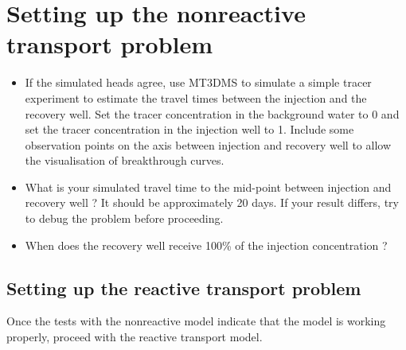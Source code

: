 \section[Setting up the nonreactive transport problem]{Setting up the nonreactive transport problem}

\begin{itemize}

\item If the simulated heads agree, use MT3DMS to simulate a simple tracer experiment
to estimate the travel times between the injection and the recovery well. 
Set the tracer concentration in the background water to 0 and set 
the tracer concentration in the injection well to 1. Include some observation 
points on the axis between injection and recovery well to allow the visualisation
of breakthrough curves.

\item What is your simulated travel time to the mid-point between 
injection and recovery well ? It should be approximately 20 days.
If your result differs, try to debug the problem before proceeding.

\item When does the recovery well receive 100\% of the injection concentration ? 

\end{itemize} 

\subsection[Setting up the reactive transport problem]{Setting up the reactive transport problem}

Once the tests with the nonreactive model indicate that the model is working properly,
proceed with the reactive transport model. 

